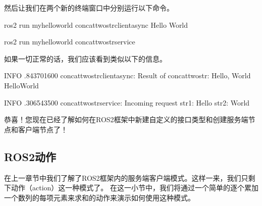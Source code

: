 \documentclass[letterpaper,10pt,english]{sphinxmanual}
\begin{document}
\sphinxAtStartPar
然后让我们在两个新的终端窗口中分别运行以下命令。

\begin{sphinxVerbatim}[commandchars=\\\{\}]
ros2 run my\PYGZus{}hello\PYGZus{}world concat\PYGZus{}two\PYGZus{}str\PYGZus{}client\PYGZus{}async Hello World
\end{sphinxVerbatim}

\begin{sphinxVerbatim}[commandchars=\\\{\}]
ros2 run my\PYGZus{}hello\PYGZus{}world concat\PYGZus{}two\PYGZus{}str\PYGZus{}service
\end{sphinxVerbatim}

\sphinxAtStartPar
如果一切正常的话，我们应该看到类似以下的信息。

\begin{sphinxVerbatim}[commandchars=\\\{\}]
\PYG{o}{[}INFO\PYG{o}{]} \PYG{o}{[}.843701600\PYG{o}{]} \PYG{o}{[}concat\PYGZus{}two\PYGZus{}str\PYGZus{}client\PYGZus{}async\PYG{o}{]}: Result of concat\PYGZus{}two\PYGZus{}str: Hello, World \PYGZhy{}\PYGZgt{} HelloWorld
\end{sphinxVerbatim}

\begin{sphinxVerbatim}[commandchars=\\\{\}]
\PYG{o}{[}INFO\PYG{o}{]} \PYG{o}{[}.306543500\PYG{o}{]} \PYG{o}{[}concat\PYGZus{}two\PYGZus{}str\PYGZus{}service\PYG{o}{]}: Incoming request
str1: Hello
str2: World
\end{sphinxVerbatim}

\sphinxAtStartPar
恭喜！您现在已经了解如何在ROS2框架中新建自定义的接口类型和创建服务端节点和客户端节点了！


\subsection{ROS2动作}
\label{\detokenize{chapter_rl_sys/ros_code_ex:id14}}\label{\detokenize{chapter_rl_sys/ros_code_ex:id15}}
\sphinxAtStartPar
在上一章节中我们了解了ROS2框架内的服务端\sphinxhyphen{}客户端模式。这样一来，我们只剩下动作（action）这一种模式了。
在这一小节中，我们将通过一个简单的逐个累加一个数列的每项元素来求和的动作来演示如何使用这种模式。
\end{document}
